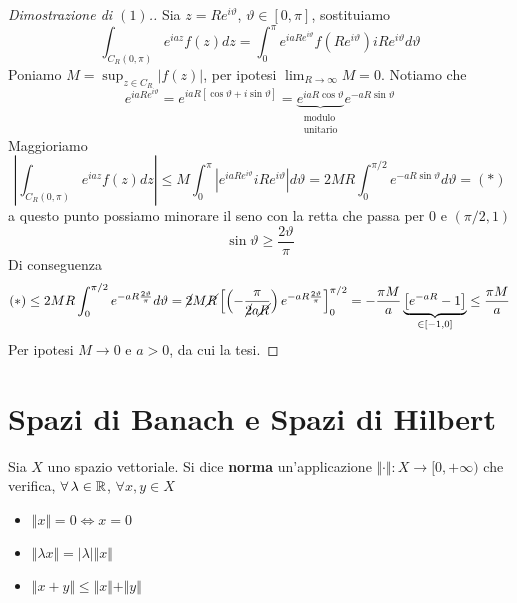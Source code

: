 \begin{proof}[Dimostrazione di $(1)$.]

Sia $z = Re^{i\vartheta}$, $\vartheta \in [0, \pi]$, sostituiamo
\begin{equation*}
\int_{C_{R} (0, \pi)} e^{iaz} f(z)dz = \int^{\pi}_{0} e^{iaRe^{i\vartheta}} f\left(Re^{i\vartheta}\right) iRe^{i\vartheta} d\vartheta
\end{equation*}
Poniamo $M = \sup_{z\in C_{R}}| f(z)| $, per ipotesi $\lim_{R\rightarrow \infty} M = 0$. Notiamo che
\begin{equation*}
e^{iaRe^{i\vartheta}} = e^{iaR[\cos \vartheta + i\sin \vartheta]} = \underbrace{e^{iaR\cos \vartheta}}_{\substack{\text{modulo}\\\text{unitario}}} e^{- aR\sin \vartheta}
\end{equation*}
Maggioriamo
\begin{equation*}
\left| \int_{C_{R} (0, \pi)} e^{iaz} f(z)dz\right| \leq M\int^{\pi}_{0}\left| e^{iaRe^{i\vartheta}} iRe^{i\vartheta}\right| d\vartheta = 2MR\int^{\pi /2}_{0} e^{- aR\sin \vartheta} d\vartheta = (*)
\end{equation*}
a questo punto possiamo minorare il seno con la retta che passa per $0$ e $(\pi /2, 1)$
\begin{equation*}
\sin \vartheta \geq \frac{2\vartheta}{\pi}
\end{equation*}
Di conseguenza
\begin{equation*}
(*) \leq 2MR\int^{\pi /2}_{0} e^{- aR\frac{2\vartheta}{\pi}} d\vartheta = \cancel{2} M\cancel{R}\left[\left(- \frac{\pi}{\cancel{2} a\cancel{R}}\right) e^{- aR\frac{2\vartheta}{\pi}}\right]^{\pi /2}_{0} = - \frac{\pi M}{a}\underbrace{\left[e^{- aR} - 1\right]}_{\in [- 1, 0]} \leq \frac{\pi M}{a}
\end{equation*}
Per ipotesi $M\rightarrow 0$ e $a > 0$, da cui la tesi.
\end{proof}

\chapter{Spazi di Banach e Spazi di Hilbert}

\begin{defn}
[Norma]
Sia $X$ uno spazio vettoriale. Si dice \textbf{norma} un'applicazione $ \Vert \cdot \Vert : X\rightarrow [0, + \infty)$ che verifica, $\forall \lambda \in \RR$, $\forall x, y\in X$
\begin{itemize}
\item $ \Vert x \Vert = 0\iff x = 0$
\item $ \Vert \lambda x \Vert =| \lambda | \Vert x \Vert $
\item $ \Vert x + y \Vert \leq \Vert x \Vert + \Vert y \Vert $
\end{itemize}
\end{defn}

